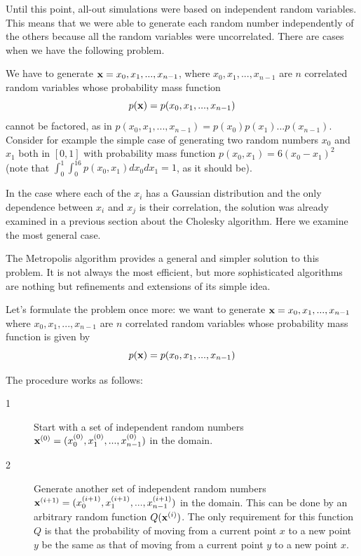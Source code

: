 \documentclass[justified,sixbynine]{tufte-book}
\theoremstyle{plain}%
\theoremstyle{definition}
\theoremstyle{remark}
\begin{document}
\begin{fullwidth}
Until this point, all-out simulations were based on independent random
variables. This means that we were able to generate each random number
independently of the others because all the random variables were
uncorrelated. There are cases when we have the following problem.

We have to generate ${\bf x}=x_0,x_1,...,x_{n-1}$, where $x_0,x_1,...,x_{n-1}$
are $n$ correlated random variables whose probability mass function
\begin{equation}
p({\bf x})=p(x_0,x_1,...,x_{n-1})
\end{equation}
cannot be factored, as in $p(x_0,x_1,...,x_{n-1})=p(x_0)p(x_1)...p(x_{n-1})$. Consider for example the simple case of generating two random numbers $x_0$
and $x_1$ both in $[0,1]$ with probability mass function $%
p(x_0,x_1)=6(x_0-x_1)^2$ (note that $\int_0^1\int_0^16p(x_0,x_1)dx_0dx_1=1$,
as it should be).

In the case where each of the $x_i$ has a Gaussian distribution and the only dependence between $x_i$ and $x_j$ is their correlation, the solution was already examined in a previous section about the Cholesky algorithm. Here we examine the most general case.

The Metropolis algorithm provides a general and simpler solution to this problem. It is not always the most efficient, but more sophisticated algorithms are nothing but refinements and extensions of its simple idea.

Let's formulate the problem once more: we want to generate ${\bf x}%
=x_0,x_1,...,x_{n-1}$ where $x_0,x_1,...,x_{n-1}$ are $n$ correlated random
variables whose probability mass function is given by
\begin{equation}
p({\bf x})=p(x_0,x_1,...,x_{n-1})
\end{equation}

The procedure works as follows:

\begin{description}
\item[1]  Start with a set of independent random numbers ${\bf x}%
^{(0)}=(x_0^{(0)},x_1^{(0)},...,x_{n-1}^{(0)})$ in the domain.

\item[2]  Generate another set of independent random numbers ${\bf x}%
^{(i+1)}=(x_0^{(i+1)},x_1^{(i+1)},...,x_{n-1}^{(i+1)})$ in the domain. This can be done by an arbitrary random function $Q({\bf x}^{(i)})$. The only requirement for this function $Q$ is that the probability of moving from a current point $x$ to a new point $y$ be the same as that of moving from a current point $y$ to a new point $x$.


\end{description}
\end{fullwidth}
\end{document}
